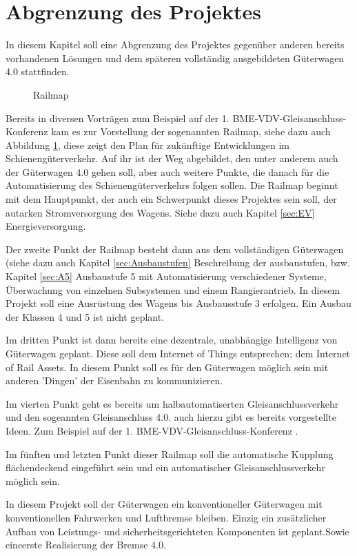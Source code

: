 \section{Abgrenzung des Projektes}
In diesem Kapitel soll eine Abgrenzung des Projektes gegenüber anderen bereits vorhandenen Lösungen und dem späteren vollständig ausgebildeten Güterwagen 4.0 stattfinden. \par
\begin{figure}[hbp]
    \centering
    
    \caption{Railmap \cite{GAK}}
    \label{fig:Railmap}
\end{figure}
Bereits in diversen Vorträgen zum Beispiel auf der 1. BME-VDV-Gleisanschluss-Konferenz \cite{GAK} kam es zur Vorstellung der sogenannten Railmap, siehe dazu auch Abbildung \ref{fig:Railmap}, diese zeigt den Plan für zukünftige Entwicklungen im Schienengüterverkehr. Auf ihr ist der Weg abgebildet, den unter anderem auch der Güterwagen 4.0  gehen soll, aber auch weitere Punkte, die danach für die Automatisierung des Schienengüterverkehrs folgen sollen. Die Railmap beginnt mit dem Hauptpunkt, der auch ein Schwerpunkt dieses Projektes sein soll, der autarken Stromversorgung des Wagens. Siehe dazu auch Kapitel \ref{sec:EV} Energieversorgung.\par
Der zweite Punkt der Railmap besteht dann aus dem vollständigen Güterwagen (siehe dazu auch Kapitel \ref{sec:Ausbaustufen} Beschreibung der ausbaustufen, bzw. Kapitel \ref{sec:A5} Ausbaustufe 5 mit Automatisierung verschiedener Systeme, Überwachung von einzelnen Subsystemen und einem Rangierantrieb. In diesem Projekt soll eine Ausrüstung des Wagens bis Ausbausstufe 3 erfolgen. Ein Ausbau der Klassen 4 und 5 ist nicht geplant. \par
Im dritten Punkt ist dann bereits eine dezentrale, unabhängige Intelligenz von Güterwagen geplant. Diese soll dem Internet of Things entsprechen; dem Internet of Rail Assets. In diesem Punkt soll es für den Güterwagen möglich sein mit anderen 'Dingen' der Eisenbahn zu kommunizieren.\par
Im vierten Punkt geht es bereits um halbautomatiserten Gleisanschlussverkehr und den sogeannten Gleisanschluss 4.0. auch hierzu gibt es bereits vorgestellte Ideen. Zum Beispiel auf der 1. BME-VDV-Gleisanschluss-Konferenz \cite{GAK}. \par
Im fünften und letzten Punkt dieser Railmap soll die automatische Kupplung flächendeckend eingeführt sein und ein automatischer Gleisanschlussverkehr möglich sein.\par
In diesem Projekt soll der Güterwagen ein konventioneller Güterwagen mit konventionellen Fahrwerken und Luftbremse bleiben. Einzig ein zusätzlicher Aufbau von Leistungs- und sicherheitsgerichteten Komponenten ist geplant.Sowie eineerste Realisierung der Bremse 4.0\cite{Stephenson, ETR_2}.\par

